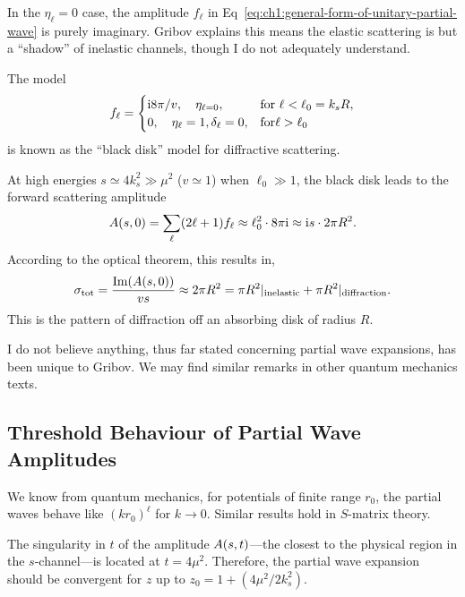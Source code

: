 \M
In the $\eta_{\ell}=0$ case, the amplitude $f_{\ell}$ in
Eq~\eqref{eq:ch1:general-form-of-unitary-partial-wave} is purely
imaginary. Gribov explains this means the elastic scattering is but a
``shadow'' of inelastic channels, though I do not adequately understand.

The model
\begin{equation}
  f_{\ell} = \begin{cases}
    \mathrm{i} 8\pi/v,\quad \eta_{\ell=0}, & \mbox{for }\ell<\ell_{0}=k_{s}R,\\
    0,\quad \eta_{\ell}=1,\delta_{\ell}=0, & \mbox{for} \ell>\ell_{0}
  \end{cases}
\end{equation}
is known as the ``black disk'' model for diffractive scattering.

\M
At high energies $s\simeq 4k_{s}^{2}\gg\mu^{2}$ ($v\simeq 1$) when
$\ell_{0}\gg1$, the black disk leads to the forward scattering amplitude
\begin{equation}
A(s,0) = \sum_{\ell}(2\ell+1)f_{\ell}\approx
\ell_{0}^{2}\cdot8\pi\mathrm{i}\approx\mathrm{i} s\cdot 2\pi R^{2}.
\end{equation}
According to the optical theorem, this results in,
\begin{equation}
\sigma_{\text{tot}} = \frac{\operatorname{Im}(A(s,0))}{vs}\approx2\pi R^{2}=\pi R^{2}|_{\text{inelastic}}+\pi
R^{2}|_{\text{diffraction}}.
\end{equation}
This is the pattern of diffraction off an absorbing disk of radius $R$.

I do not believe anything, thus far stated concerning partial wave
expansions, has been unique to Gribov. We may find similar remarks in
other quantum mechanics texts.

\subsection{Threshold Behaviour of Partial Wave Amplitudes}

\M We know from quantum mechanics, for potentials of finite range
$r_{0}$, the partial waves behave like $(kr_{0})^{\ell}$ for $k\to 0$.
Similar results hold in $S$-matrix theory.

\M The singularity in $t$ of the amplitude $A(s,t)$---the
closest to the physical region in the $s$-channel---is located at
$t=4\mu^{2}$. Therefore, the partial wave expansion should be convergent
for $z$ up to $z_{0}=1 + (4\mu^{2}/2k_{s}^{2})$.

